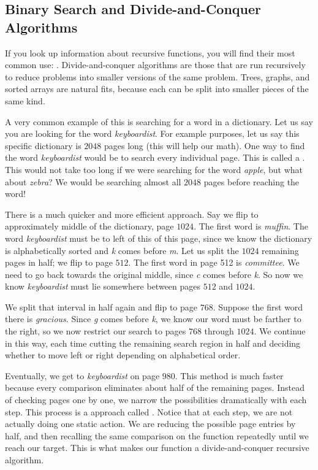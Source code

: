 \subsection{Binary Search and Divide-and-Conquer Algorithms}
If you look up information about recursive functions, you will find their most common use: . Divide-and-conquer algorithms are those that are run recursively to reduce problems into smaller versions of the same problem. Trees, graphs, and sorted arrays are natural fits, because each can be split into smaller pieces of the same kind.

A very common example of this is searching for a word in a dictionary. Let us say you are looking for the word \textit{keyboardist}. For example purposes, let us say this specific dictionary is $2048$ pages long (this will help our math). One way to find the word \textit{keyboardist} would be to search every individual page. This is called a . This would not take too long if we were searching for the word \textit{apple}, but what about \textit{zebra}? We would be searching almost all $2048$ pages before reaching the word! 

There is a much quicker and more efficient approach. Say we flip to approximately middle of the dictionary, page $1024$. The first word is \textit{muffin}. The word \textit{keyboardist} must be to left of this of this page, since we know the dictionary is alphabetically sorted and \textit{k} comes before \textit{m}. Let us split the $1024$ remaining pages in half; we flip to page $512$. The first word in page 512 is \textit{committee}. We need to go back towards the original middle, since \textit{c} comes before \textit{k}. So now we know \textit{keyboardist} must lie somewhere between pages $512$ and $1024$.

We split that interval in half again and flip to page $768$. Suppose the first word there is \textit{gracious}. Since \textit{g} comes before \textit{k}, we know our word must be farther to the right, so we now restrict our search to pages $768$ through $1024$. We continue in this way, each time cutting the remaining search region in half and deciding whether to move left or right depending on alphabetical order.

Eventually, we get to \textit{keyboardist} on page $980$. This method is much faster because every comparison eliminates about half of the remaining pages. Instead of checking pages one by one, we narrow the possibilities dramatically with each step. This process is a  approach called . Notice that at each step, we are not actually doing one static action. We are reducing the possible page entries by half, and then recalling the same comparison on the function repeatedly until we reach our target. This is what makes our function a divide-and-conquer recursive algorithm. 

